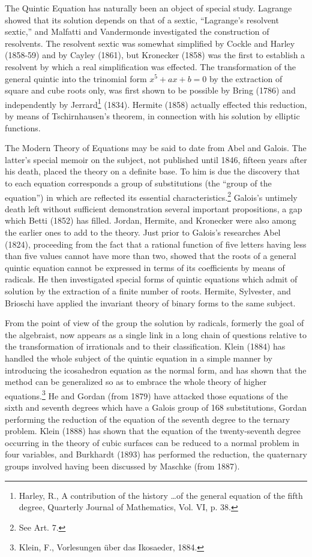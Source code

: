 \documentclass[oneside]{book}
\begin{document}
{The Quintic Equation has naturally been an object of special
study. Lagrange showed that its solution depends on that of a
sextic, ``Lagrange's resolvent sextic,'' and Malfatti and
Vandermonde investigated the construction of resolvents. The
resolvent sextic was somewhat simplified by Cockle and Harley
(1858-59) and by Cayley (1861), but Kronecker (1858) was the first
to establish a resolvent by which a real simplification was
effected. The transformation of the general quintic into the
trinomial form $x^5+ax+b=0$ by the extraction of square and cube
roots only, was first shown to be possible by Bring (1786) and
independently by Jerrard\footnote{Harley, R., A contribution of
the history \ldots of the general equation of the fifth degree,
Quarterly Journal of Mathematics, Vol. VI, p. 38.} (1834). Hermite
(1858) actually effected this reduction, by means of Tschirnhausen's
theorem, in connection with his solution by elliptic functions.

The Modern Theory of Equations may be said to date from Abel and
Galois. The latter's special memoir on the subject, not published
until 1846, fifteen years after his death, placed the theory on a
definite base. To him is due the discovery that to each equation
corresponds a group of substitutions (the ``group of the equation'')
in which are reflected its essential characteristics.\footnote{See
Art. 7.} Galois's untimely death left without sufficient
demonstration several important propositions, a gap which Betti
(1852) has filled. Jordan, Hermite, and Kronecker were also among
the earlier ones to add to the theory. Just prior to Galois's
researches Abel (1824), proceeding from the fact that a rational
function of five letters having less than five values cannot have
more than two, showed that the roots of a general quintic equation
cannot be expressed in terms of its coefficients by means of
radicals. He then investigated special forms of quintic equations
which admit of solution by the extraction of a finite number of
roots. Hermite, Sylvester, and Brioschi have applied the invariant
theory of binary forms to the same subject.

From the point of view of the group the solution by radicals,
formerly the goal of the algebraist, now appears as a single link in
a long chain of questions relative to the transformation of
irrationals and to their classification. Klein (1884) has handled
the whole subject of the quintic equation in a simple manner by
introducing the icosahedron equation as the normal form, and has
shown that the method can be generalized so as to embrace the whole
theory of higher equations.\footnote{Klein, F., Vorlesungen \"uber
das Ikosaeder, 1884.} He and Gordan (from 1879) have attacked those
equations of the sixth and seventh degrees which have a Galois group
of 168 substitutions, Gordan performing the reduction of the
equation of the seventh degree to the ternary problem. Klein (1888)
has shown that the equation of the twenty-seventh degree occurring
in the theory of cubic surfaces can be reduced to a normal problem
in four variables, and Burkhardt (1893) has performed the reduction,
the quaternary groups involved having been discussed by Maschke
(from 1887).

}
\end{document}
